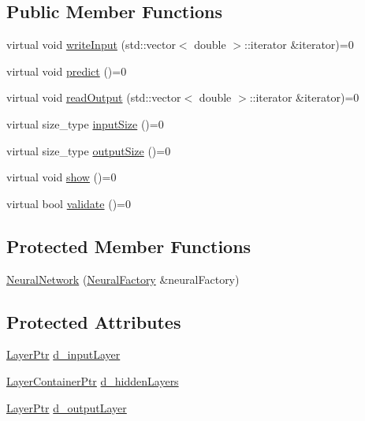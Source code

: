 \subsection*{Public Member Functions}
\begin{DoxyCompactItemize}
\item 
virtual void \hyperlink{class_neural_network_ad84eb675d31eab6e5d45c37f686d8186}{writeInput} (std::vector$<$ double $>$::iterator \&iterator)=0
\item 
virtual void \hyperlink{class_neural_network_ac5d16c83c3159ecd075636e82688b2ed}{predict} ()=0
\item 
virtual void \hyperlink{class_neural_network_acb06905cd65e1f40b79cf2cc30e5987a}{readOutput} (std::vector$<$ double $>$::iterator \&iterator)=0
\item 
virtual size\_\-type \hyperlink{class_neural_network_a9b59b8576a47750009669a6885524d1e}{inputSize} ()=0
\item 
virtual size\_\-type \hyperlink{class_neural_network_af7bbfbd5635c29d66fbb37e74800ec15}{outputSize} ()=0
\item 
virtual void \hyperlink{class_neural_network_abe7893d4df14b19f059f9fca0175cbe1}{show} ()=0
\item 
virtual bool \hyperlink{class_neural_network_a7ab39cee7bef69eff19cca490ff5d7c0}{validate} ()=0
\end{DoxyCompactItemize}
\subsection*{Protected Member Functions}
\begin{DoxyCompactItemize}
\item 
\hyperlink{class_neural_network_a94089745c72c49c41c51aaa73935145e}{NeuralNetwork} (\hyperlink{class_neural_factory}{NeuralFactory} \&neuralFactory)
\end{DoxyCompactItemize}
\subsection*{Protected Attributes}
\begin{DoxyCompactItemize}
\item 
\hyperlink{_a_m_o_r_e_8h_acce4b66db3921b7326fbe1a04a56e5fc}{LayerPtr} \hyperlink{class_neural_network_ada358911107a3a4cdccf0812d876393f}{d\_\-inputLayer}
\item 
\hyperlink{_a_m_o_r_e_8h_af261b546158af61fc27686fb926961f2}{LayerContainerPtr} \hyperlink{class_neural_network_ae47be9819644d8ecf23328cf4e8f6dfb}{d\_\-hiddenLayers}
\item 
\hyperlink{_a_m_o_r_e_8h_acce4b66db3921b7326fbe1a04a56e5fc}{LayerPtr} \hyperlink{class_neural_network_af61fb83fcaaf81c5fa0574f7d3bdc268}{d\_\-outputLayer}
\end{DoxyCompactItemize}
